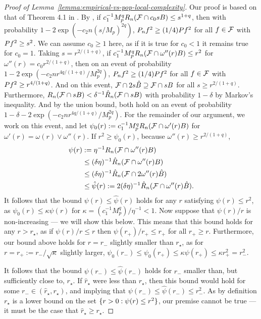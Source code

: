 \begin{proof}[Proof of Lemma~\ref{lemma:empirical-vs-pop-local-complexity}]
Our proof is based on that of Theorem 4.1 in \citet{bartlett2005local}.
By \citet[Corollary 3.6]{mendelson2017extending}, if $c_1^{-1} M_p^q R_n(\mathcal{F} \cap c_0 s B) \le s^{1+q}$,
then with probability $1-2\exp(-c_2n (s/M_p)^{2q})$,
$\Pn f^2 \ge (1/4)\P f^2$ for all $f \in \mathcal{F}$ with $\P f^2 \ge s^2$. We can assume $c_0 \ge 1$ here,
as if it is true for $c_0 < 1$ it remains true for $c_0=1$.
Taking $s=r^{2/(1+q)}$, if $c_1^{-1} M_p^q R_n(\mathcal{F} \cap \omega''(r) B) \le r^2$
for $\omega''(r)=c_0 r^{2/(1+q)}$, then on an event of probability $1-2\exp(-c_2 n  r^{4q/(1+q)}/M_p^{2q})$,
$\Pn f^2 \ge (1/4)\P f^2$ for all $f \in \mathcal{F}$ with $\P f^2 \ge r^{4/(1+q)}$. And on this event, 
$\mathcal{F} \cap 2s\hat B \supseteq \mathcal{F} \cap sB$ for all $s \ge r^{2/(1+q)}$. 
Furthermore, $R_n(\mathcal{F} \cap sB) < \delta^{-1}\hat R_n(\mathcal{F} \cap s B)$ with probability $1-\delta$
by Markov's inequality. And by the union bound, 
both hold on an event of probability $1-\delta - 2\exp(-c_2 n r^{4q/(1+q)}/M_p^{2q})$.
For the remainder of our argument, we work on this event, and let 
$\psi_0(r) := c_1^{-1} M_p^q R_n(\mathcal{F} \cap \omega'(r) B)$ for $\omega'(r) = \omega(r) \vee \omega''(r)$.
If $r^2 \ge \psi_0(r)$, because $\omega''(r) \ge r^{2/(1+q)}$,
\begin{align*} 
\psi(r) &:= \eta^{-1} R_n(\mathcal{F} \cap \omega''(r)B) \\
&\le  (\delta \eta)^{-1} \hat R_n(\mathcal{F} \cap \omega''(r) B) \\
&\le  (\delta \eta)^{-1} \hat R_n(\mathcal{F} \cap 2 \omega''(r) \hat B)  \\
&\le  \hat\psi(r) := 2(\delta \eta)^{-1} \hat R_n(\mathcal{F} \cap \omega''(r) \hat B).
\end{align*}
It follows that the bound $\psi(r) \le \hat \psi(r)$ holds for any $r$ satisfying $\psi(r) \le r^2$, 
as $\psi_0(r) \le \kappa \psi(r)$ for $\kappa = (c_1^{-1} M_p^q)/\eta^{-1} < 1$. Now suppose that $\psi(r)/r$ is non-increasing --- we will show this below.
This means that this bound holds for any $r > r_{\star}$, as if $\psi(r)/r \le r$ then $\psi(r_+)/r_+ \le r_+$
for all $r_+ \ge r$. Furthermore, our bound above holds for 
$r=r_-$ slightly smaller than $r_{\star}$, as for $r=r_+ := r_-/\sqrt{\kappa} $ slightly larger,
$\psi_0(r_-) \le \psi_0(r_+) \le \kappa \psi(r_+) \le \kappa r_+^2 = r_-^2$.


It follows that the bound $\psi(r_-) \le \hat \psi(r_-)$ holds for $r_-$ smaller than, but sufficiently close to, $r_{\star}$.
If $\hat r_{\star}$ were less than $r_{\star}$, then this bound would hold for some $r_- \in (\hat r_{\star}, r_{\star})$,
and implying that $\psi(r_-) \le \hat \psi(r_-) \le r_-^2$. As by definition $r_{\star}$ is a lower bound on 
the set $\{r > 0 : \psi(r) \le r^2\}$, our premise cannot be true --- it must be the case that $\hat r_{\star} \ge r_{\star}$.



\end{proof}
